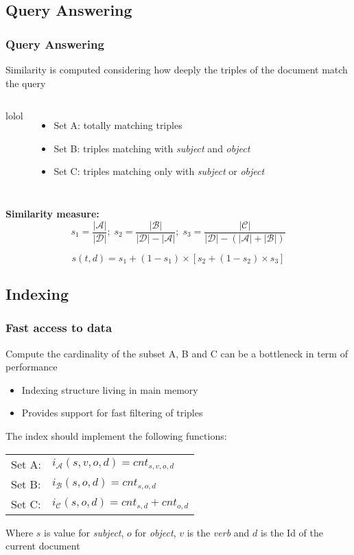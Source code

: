\documentclass{beamer}
\begin{document}
\subsection{Query Answering}

\begin{frame}
\frametitle{Query Answering}
Similarity is computed considering how deeply the triples of the
document match the query
\begin{columns}
lolol
\begin{itemize}
\item Set A: totally matching triples
\item Set B: triples matching with \emph{subject} and \emph{object}
\item Set C: triples matching only with \emph{subject} or \emph{object}
\end{itemize}
\end{columns}
{\color{red}\bfseries{Similarity measure:}}
$$
s_{1} = \frac{|\mathcal{A}|}{|\mathcal{D}|};\;
s_{2} = \frac{|\mathcal{B}|}{|\mathcal{D}| - |\mathcal{A}|};\;
s_{3} = \frac{|\mathcal{C}|}{|\mathcal{D}|-(|\mathcal{A}|+|\mathcal{B}|)}
$$

$$
s (t, d) = s_{1} + (1 - s_{1}) \times
[s_{2} + (1 - s_{2}) \times s_{3}]
$$
\end{frame}

\subsection{Indexing}

\begin{frame}
\frametitle{Fast access to data}
Compute the cardinality of the subset A, B and C can be a bottleneck
in term of performance
\begin{itemize}
\item Indexing structure living in main memory
\item Provides support for fast filtering of triples
\end{itemize}
\vspace{5mm}
The index should implement the following functions:\\
\vspace{2mm}
\begin{center}
\begin{tabular}{ll}
Set A: & $i_{\mathcal{A}} (s,v,o,d) = cnt_{s,v,o,d}$\\
Set B: & $i_{\mathcal{B}} (s,o,d) = cnt_{s,o,d}$\\
Set C: & $i_{\mathcal{C}} (s,o,d) = cnt_{s,d} + cnt_{o,d}$\\
\end{tabular}
\end{center}
\vspace{3mm}
Where $s$ is value for \emph{subject}, $o$ for \emph{object}, $v$ is
the \emph{verb} and $d$ is the Id of the current document
\end{frame}
\end{document}

